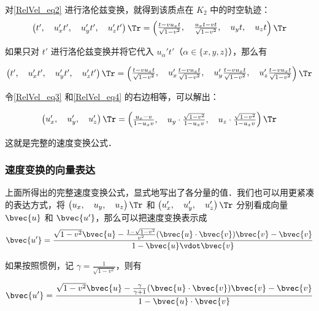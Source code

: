 对\autoref{RelVel_eq2} 进行洛伦兹变换，就得到该质点在 $K_2$ 中的时空轨迹：
\begin{equation}\label{RelVel_eq3}
\left(\begin{matrix}t',\quad u_x't',\quad u_y't',\quad u_z't'\end{matrix} \right)\Tr 
= 
\left(\begin{matrix}\frac{t-vu_xt}{\sqrt{1-v^2}},\quad\frac{u_xt-vt}{\sqrt{1-v^2}},\quad u_yt,\quad u_zt\end{matrix} \right)\Tr 
\end{equation}

如果只对 $t'$ 进行洛伦兹变换并将它代入 $u_\alpha't'$（$\alpha\in\{x, y, z\}$），那么有

\begin{equation}\label{RelVel_eq4}
\left(\begin{matrix}t',\quad u_x't',\quad u_y't',\quad u_z't'\end{matrix} \right)\Tr 
= 
\left(\begin{matrix}\frac{t-vu_xt}{\sqrt{1-v^2}},\quad u_x'\frac{t-vu_xt}{\sqrt{1-v^2}},\quad u_y'\frac{t-vu_xt}{\sqrt{1-v^2}},\quad u_z'\frac{t-vu_xt}{\sqrt{1-v^2}}\end{matrix} \right)\Tr 
\end{equation}

令\autoref{RelVel_eq3} 和\autoref{RelVel_eq4} 的右边相等，可以解出：

\begin{equation}
\left(\begin{matrix}u_x',\quad u_y',\quad u_z'\end{matrix} \right)\Tr 
= 
\left(\begin{matrix}\frac{u_x-v}{1-u_xv},\quad u_y\cdot\frac{\sqrt{1-v^2}}{1-u_xv},\quad u_z\cdot\frac{\sqrt{1-v^2}}{1-u_xv}\end{matrix} \right)\Tr 
\end{equation}

这就是完整的速度变换公式．

\subsubsection{速度变换的向量表达}

上面所得出的完整速度变换公式，显式地写出了各分量的值．我们也可以用更紧凑的表达方式，将 $\left(\begin{matrix}u_x,\quad u_y,\quad u_z\end{matrix} \right)\Tr $ 和 $\left(\begin{matrix}u_x',\quad u_y',\quad u_z'\end{matrix} \right)\Tr$ 分别看成向量 $\bvec{u}$ 和 $\bvec{u'}$，那么可以把速度变换表示成
\begin{equation}
\bvec{u'}=\frac{\sqrt{1-v^2}\bvec{u}-\frac{1-\sqrt{1-v^2}}{v^2}(\bvec{u}\cdot\bvec{v})\bvec{v}-\bvec{v}}{1-\bvec{u}\vdot\bvec{v}}
\end{equation}

如果按照惯例，记 $\gamma=\frac{1}{\sqrt{1-v^2}}$，则有

\begin{equation}
\bvec{u'}=\frac{\sqrt{1-v^2}\bvec{u}-\frac{\gamma}{\gamma+1}(\bvec{u}\cdot\bvec{v})\bvec{v}-\bvec{v}}{1-\bvec{u}\cdot\bvec{v}}
\end{equation}




